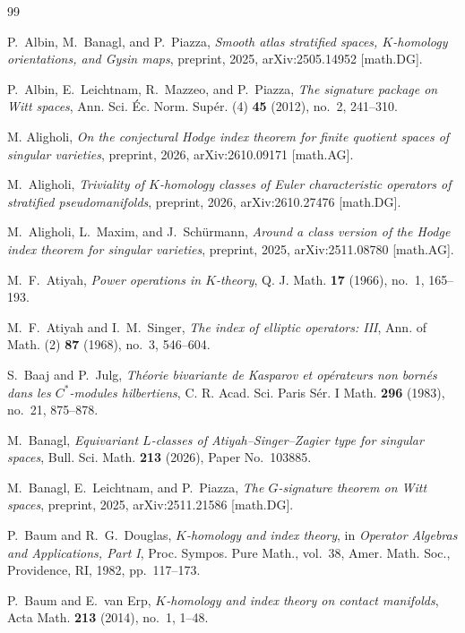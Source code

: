 \documentclass[11pt,leqno,twoside]{amsart}
\theoremstyle{plainsl}
\theoremstyle{definition}
\begin{document}
\begin{thebibliography}{99}

P.~Albin, M.~Banagl, and P.~Piazza,
\emph{Smooth atlas stratified spaces, $K$-homology orientations, and Gysin maps},
preprint, 2025, 	arXiv:2505.14952 [math.DG].

P.~Albin, E.~Leichtnam, R.~Mazzeo, and P.~Piazza,
\emph{The signature package on Witt spaces},
Ann. Sci. \'Ec. Norm. Sup\'er. (4) \textbf{45} (2012), no.~2, 241--310.

M. Aligholi,
\emph{On the conjectural Hodge index theorem for finite quotient spaces of singular varieties},
preprint, 2026, arXiv:2610.09171 [math.AG].

M.~Aligholi,
\emph{Triviality of \(K\)-homology classes of Euler characteristic operators of  stratified pseudomanifolds}, preprint,
2026, 	arXiv:2610.27476 [math.DG].




M.~Aligholi, L.~Maxim, and J.~Sch\"urmann,
\emph{Around a class version of the Hodge index theorem for singular varieties},
preprint, 2025, arXiv:2511.08780 [math.AG].

M.~F.~Atiyah,
\emph{Power operations in $K$-theory},
Q. J. Math. \textbf{17} (1966), no.~1, 165--193.

M.~F.~Atiyah and I.~M.~Singer,
\emph{The index of elliptic operators: III},
Ann. of Math. (2) \textbf{87} (1968), no.~3, 546--604.

S.~Baaj and P.~Julg,
\emph{Th\'eorie bivariante de Kasparov et op\'erateurs non born\'es
dans les $C^*$-modules hilbertiens},
C. R. Acad. Sci. Paris S\'er. I Math.
\textbf{296} (1983), no.~21, 875--878.

M.~Banagl,
\emph{Equivariant $L$-classes of Atiyah--Singer--Zagier type for singular spaces},
Bull. Sci. Math. \textbf{213} (2026), Paper No.~103885.

M.~Banagl, E.~Leichtnam, and P.~Piazza,
\emph{The $G$-signature theorem on Witt spaces},
preprint, 2025, arXiv:2511.21586 [math.DG].

P.~Baum and R.~G.~Douglas,
\emph{$K$-homology and index theory},
in \emph{Operator Algebras and Applications, Part I},
Proc. Sympos. Pure Math., vol.~38,
Amer. Math. Soc., Providence, RI, 1982, pp.~117--173.

P.~Baum and E.~van Erp,
\emph{$K$-homology and index theory on contact manifolds},
Acta Math. \textbf{213} (2014), no.~1, 1--48.


\end{thebibliography}
\end{document}
